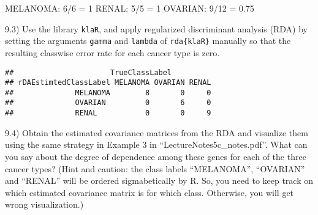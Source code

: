 \documentclass[
  11pt,
]{article}
\newenvironment{Shaded}{\begin{snugshade}}{\end{snugshade}}
\newcommand{\AttributeTok}[1]{\textcolor[rgb]{0.77,0.63,0.00}{#1}}
\newcommand{\CommentTok}[1]{\textcolor[rgb]{0.56,0.35,0.01}{\textit{#1}}}
\newcommand{\FloatTok}[1]{\textcolor[rgb]{0.00,0.00,0.81}{#1}}
\newcommand{\FunctionTok}[1]{\textcolor[rgb]{0.00,0.00,0.00}{#1}}
\newcommand{\NormalTok}[1]{#1}
\newcommand{\OtherTok}[1]{\textcolor[rgb]{0.56,0.35,0.01}{#1}}
\newcommand{\SpecialCharTok}[1]{\textcolor[rgb]{0.00,0.00,0.00}{#1}}
\begin{document}
MELANOMA: 6/6 = 1 RENAL: 5/5 = 1 OVARIAN: 9/12 = 0.75

9.3) Use the library \texttt{klaR}, and apply regularized discriminant
analysis (RDA) by setting the arguments \texttt{gamma} and
\texttt{lambda} of \texttt{rda\{klaR\}} manually so that the resulting
classwise error rate for each cancer type is zero.

\begin{Shaded}
\end{Shaded}

\begin{verbatim}
##                      TrueClassLabel
## rDAEstimtedClassLabel MELANOMA OVARIAN RENAL
##              MELANOMA        8       0     0
##              OVARIAN         0       6     0
##              RENAL           0       0     9
\end{verbatim}

9.4) Obtain the estimated covariance matrices from the RDA and visualize
them using the same strategy in Example 3 in
``LectureNotes5c\_notes.pdf''. What can you say about the degree of
dependence among these genes for each of the three cancer types? (Hint
and caution: the class labels ``MELANOMA'', ``OVARIAN'' and ``RENAL''
will be ordered sigmabetically by R. So, you need to keep track on which
estimated covariance matrix is for which class. Otherwise, you will get
wrong visualization.)
\end{document}

